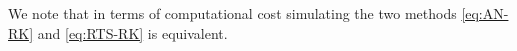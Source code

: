 \documentclass[10pt]{article}
\begin{document}
\begin{remark} We note that in terms of computational cost simulating the two methods \eqref{eq:AN-RK} and \eqref{eq:RTS-RK} is equivalent.
\end{remark}
\end{document}
